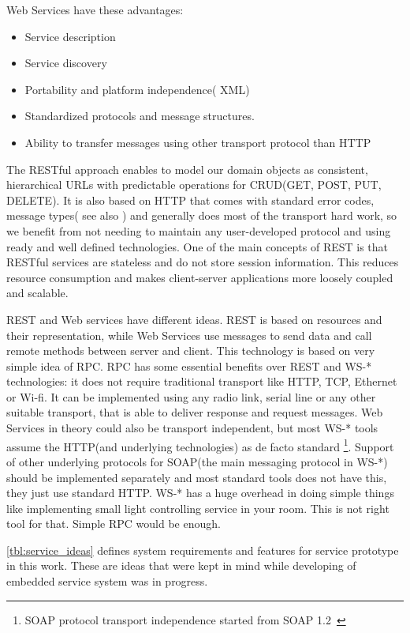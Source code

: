 Web Services have these advantages:
\begin{itemize}
  \item Service description
  \item Service discovery
  \item Portability and platform independence( XML)
  \item Standardized protocols and message structures.
  \item Ability to transfer messages using other transport protocol than HTTP
\end{itemize}

The RESTful approach enables to model our domain objects as
consistent, hierarchical URLs with predictable operations for \gls{CRUD}(GET,
POST, PUT, DELETE). It is also based on HTTP that comes with standard error
codes, message types( see also ) and
generally does most of the transport hard work, so we benefit from not
needing to maintain any user-developed protocol and using ready and well defined
technologies. One of the main concepts of REST is that RESTful services are
stateless and do not store session information. This reduces
resource consumption and makes client-server applications more loosely coupled
and scalable.

REST and Web services have different ideas. REST is based on resources and their
representation, while Web Services use messages to send data and call remote
methods between server and client. This technology is based on very simple idea
of RPC. RPC has some essential benefits over REST and
WS-* technologies: it does not require traditional transport like HTTP, TCP,
Ethernet or Wi-fi. It can be implemented using any radio link, serial line or
any other suitable transport, that is able to deliver response and request
messages. Web Services in theory could also be transport independent, but most
WS-* tools assume the HTTP(and underlying technologies) as de facto standard
\footnote{SOAP protocol transport independence started from SOAP
1.2~\cite{soap_protocol_spec}}. Support of other underlying protocols for
SOAP(the main messaging protocol in WS-*) should be implemented separately and
most standard tools does not have this, they just use standard HTTP. WS-* has a
huge overhead in doing simple things like implementing small light
controlling service in your room. This is not right tool for that. Simple RPC
would be enough.

\autoref{tbl:service_ideas} defines system requirements and features for service prototype in this
work. These are ideas that were kept in mind while developing of embedded
service system was in progress.

